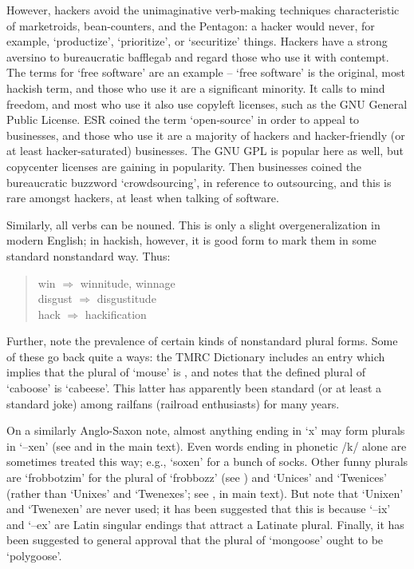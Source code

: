 	However, hackers avoid the unimaginative verb-making techniques
	characteristic of marketroids, bean-counters, and the Pentagon: a hacker
	would never, for example, `productize', `prioritize', or `securitize'
	things. Hackers have a strong aversino to bureaucratic bafflegab and regard
	those who use it with contempt. The terms for `free software' are an
	example -- `free software' is the original, most hackish term, and those
	who use it are a significant minority. It calls to mind freedom, and most
	who use it also use copyleft licenses, such as the GNU General Public
	License. ESR coined the term `open-source' in order to appeal to
	businesses, and those who use it are a majority of hackers and
	hacker-friendly (or at least hacker-saturated) businesses. The GNU GPL is
	popular here as well, but copycenter licenses are gaining in popularity.
	Then businesses coined the bureaucratic buzzword `crowdsourcing', in
	reference to outsourcing, and this is rare amongst hackers, at least when
	talking of software.

	Similarly, all verbs can be nouned. This is only a slight
	overgeneralization in modern English; in hackish, however, it is good form
	to mark them in some standard nonstandard way. Thus:

	\begin{quote}
		win $\Rightarrow$ winnitude, winnage\\
		disgust $\Rightarrow$ disgustitude\\
		hack $\Rightarrow$ hackification
	\end{quote}

	Further, note the prevalence of certain kinds of nonstandard plural forms.
	Some of these go back quite a ways: the TMRC Dictionary includes an entry
	which implies that the plural of `mouse' is , and notes
	that the defined plural of `caboose' is `cabeese'. This latter has
	apparently been standard (or at least a standard joke) among railfans
	(railroad enthusiasts) for many years.

	On a similarly Anglo-Saxon note, almost anything ending in `x' may form
	plurals in `--xen' (see  and  in the main
	text). Even words ending in phonetic /k/ alone are sometimes treated this
	way; e.g., `soxen' for a bunch of socks. Other funny plurals are
	`frobbotzim' for the plural of `frobbozz' (see ) and
	`Unices' and `Twenices' (rather than `Unixes' and `Twenexes'; see
	,  in main text). But note that `Unixen'
	and `Twenexen' are never used; it has been suggested that this is because
	`--ix' and `--ex' are Latin singular endings that attract a Latinate
	plural.  Finally, it has been suggested to general approval that the plural
	of `mongoose' ought to be `polygoose'.

